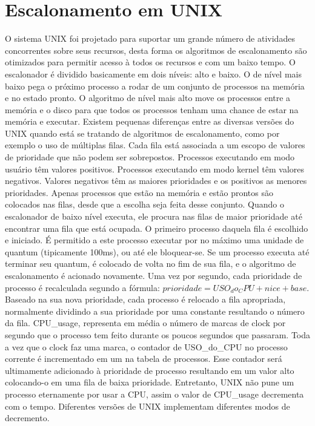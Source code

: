 \section{Escalonamento em UNIX}
O sistema UNIX foi projetado para suportar um grande número de atividades concorrentes sobre seus recursos, desta forma os algoritmos de escalonamento são otimizados para permitir acesso à todos os recursos e com um baixo tempo. O escalonador é dividido basicamente em dois níveis: alto e baixo. O de nível mais baixo pega o próximo processo a rodar de um conjunto de processos na memória e no estado pronto. O algoritmo de nível mais alto move os processos entre a memória e o disco para que todos os processos tenham uma chance de estar na memória e executar.
Existem pequenas diferenças entre as diversas versões do UNIX quando está se tratando de algoritmos de escalonamento, como por exemplo o uso de múltiplas filas. Cada fila está associada a um escopo de valores de prioridade que não podem ser sobrepostos. Processos executando em modo usuário têm valores positivos.
Processos executando em modo kernel têm valores negativos. Valores negativos têm as maiores prioridades e os positivos as menores prioridades. Apenas processos que estão na memória e estão prontos são colocados nas filas, desde que a escolha seja feita desse conjunto.
Quando o escalonador de baixo nível executa, ele procura nas filas de maior prioridade até encontrar uma fila que está ocupada. O primeiro processo daquela fila é escolhido e iniciado. É permitido a este processo executar por no máximo uma unidade de quantum (tipicamente 100ms), ou até ele bloquear-se. Se um processo executa até terminar seu quantum, é colocado de volta no fim de sua fila, e o algoritmo de escalonamento é acionado novamente. 
Uma vez por segundo, cada prioridade de processo é recalculada segundo a fórmula: 
	$ prioridade = USO_do_CPU + nice + base. $
Baseado na sua nova prioridade, cada processo é relocado a fila apropriada, normalmente dividindo a sua prioridade por uma constante resultando o número da fila. CPU_usage, representa em média o número de marcas de clock por segundo que o processo tem feito durante os poucos segundos que passaram.
Toda a vez que o clock faz uma marca, o contador de USO_do_CPU no processo corrente é incrementado em um na tabela de processos. Esse contador será ultimamente adicionado à prioridade de processo resultando em um valor alto colocando-o em uma fila de baixa prioridade.
Entretanto, UNIX não pune um processo eternamente por usar a CPU, assim o valor de CPU_usage decrementa com o tempo. Diferentes versões de UNIX implementam diferentes modos de decremento.
